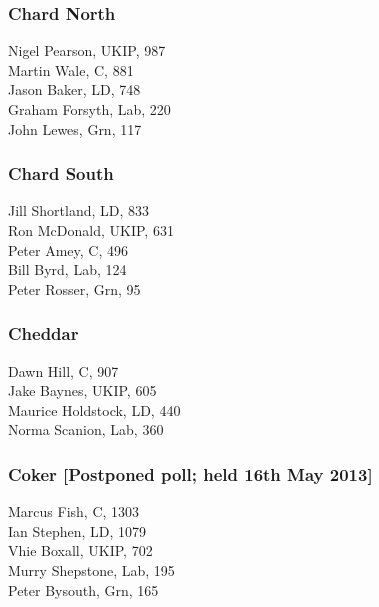 \documentclass[a4paper,openany,10pt]{book}
\begin{document}
\subsubsection*{Chard North}



Nigel Pearson, UKIP, 987\\
Martin Wale, C, 881\\
Jason Baker, LD, 748\\
Graham Forsyth, Lab, 220\\
John Lewes, Grn, 117\\


\subsubsection*{Chard South}



Jill Shortland, LD, 833\\
Ron McDonald, UKIP, 631\\
Peter Amey, C, 496\\
Bill Byrd, Lab, 124\\
Peter Rosser, Grn, 95\\


\subsubsection*{Cheddar}



Dawn Hill, C, 907\\
Jake Baynes, UKIP, 605\\
Maurice Holdstock, LD, 440\\
Norma Scanion, Lab, 360\\


\subsubsection*{Coker \hspace*{\fill}\nolinebreak[1]%
\enspace\hspace*{\fill}
[Postponed poll; held 16th May 2013]}


\label{CokerSomerset}


Marcus Fish, C, 1303\\
Ian Stephen, LD, 1079\\
Vhie Boxall, UKIP, 702\\
Murry Shepstone, Lab, 195\\
Peter Bysouth, Grn, 165\\
\end{document}
